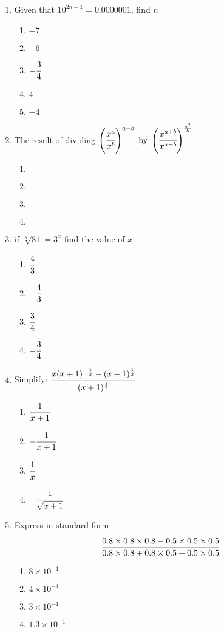\begin{multicols}{2}
\begin{enumerate}[label={\arabic*.}]
\item Given that $10^{2n + 1} = 0.0000001$, find $n$
	\begin{enumerate}[label={\Alph*.}]
	\item \(-7\)
	\item \(-6\)
	\item \(-\cfrac{3}{4}\)
	\item \(4\)
	\item \(-4\)
	\end{enumerate}
\item The result of dividing $\left(\cfrac{x^a}{x^b}\right)^{a-b} \text{ by } \left(\cfrac{x^{a+b}}{x^{a-b}}\right)^{\frac{a^2}{b}}$
	\begin{enumerate}[label={\Alph*.}]
	\item \(\)
	\item \(\)
	\item \(\)
	\item \(\)
	\end{enumerate}
\item if $\sqrt[3]{81} = 3^x$ find the value of $x$
	\begin{enumerate}[label={\Alph*.}]
	\item \(\cfrac{4}{3}\)
	\item \(-\cfrac{4}{3}\)
	\item \(\cfrac{3}{4}\)
	\item \(-\cfrac{3}{4}\)
	\end{enumerate}
\item Simplify: $\cfrac{x(x+1)^{-\frac{1}{2}} -(x+1)^{\frac{1}{2}}}{(x+1)^{\frac{1}{2}}} $
	\begin{enumerate}[label={\Alph*.}]
	\item \(\cfrac{1}{x+1}\)
	\item \(-\cfrac{1}{x+1}\)
	\item \(\cfrac{1}{x}\)
	\item \(-\cfrac{1}{\sqrt{x+1}}\)
	\end{enumerate}
\item Express in standard form \, $$\cfrac{0.8 \times 0.8 \times 0.8 - 0.5 \times 0.5 \times 0.5}{0.8 \times 0.8 + 0.8 \times 0.5 + 0.5 \times 0.5}$$
	\begin{enumerate}[label={\Alph*.}]
	\item \(8 \times 10^{-1}\)
	\item \(4 \times 10^{-1}\)
	\item \(3 \times 10^{-1}\)
	\item \(1.3 \times 10^{-1}\)
	\end{enumerate}

\end{enumerate}
\end{multicols}
